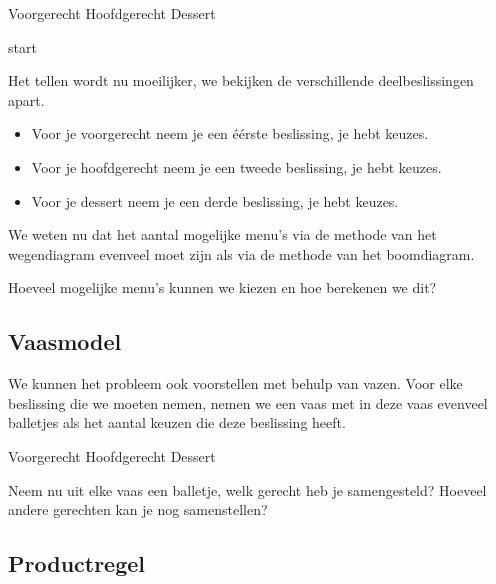 \documentclass[12pt,twoside]{article}
\begin{document}
\hspace*{2cm} Voorgerecht \hfill Hoofdgerecht \hfill Dessert \hspace*{2cm}

\vspace*{3cm}
start
\vspace*{3cm}

Het tellen wordt nu moeilijker, we bekijken de verschillende deelbeslissingen apart.
\begin{itemize}
  \item Voor je voorgerecht neem je een éérste beslissing, je hebt \arule{2cm} keuzes.
  \item Voor je hoofdgerecht neem je een tweede beslissing, je hebt \arule{2cm} keuzes.
  \item Voor je dessert neem je een derde beslissing, je hebt \arule{2cm} keuzes.
\end{itemize}

We weten nu dat het aantal mogelijke menu's via de methode van het wegendiagram evenveel moet zijn als via de methode van het boomdiagram.

\begin{oefening}
Hoeveel mogelijke menu's kunnen we kiezen en hoe berekenen we dit?
\end{oefening}

\subsection{Vaasmodel}

We kunnen het probleem ook voorstellen met behulp van vazen. Voor elke beslissing die we moeten nemen, nemen we een vaas met in deze vaas evenveel balletjes als het aantal keuzen die deze beslissing heeft.

\hspace*{2cm} Voorgerecht \hfill Hoofdgerecht \hfill Dessert \hspace*{2cm}

\vspace*{4cm}

\begin{oefening}
Neem nu uit elke vaas een balletje, welk gerecht heb je samengesteld? Hoeveel andere gerechten kan je nog samenstellen?
\end{oefening}

\subsection{Productregel}
\end{document}
